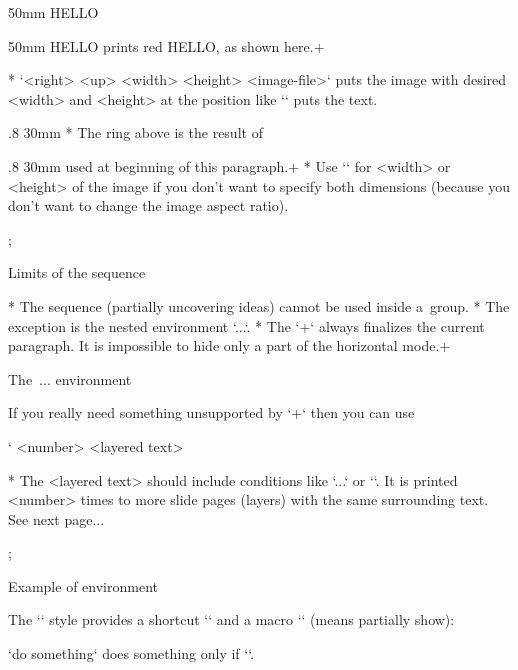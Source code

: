 \begtt
\puttext 0mm 50mm {\Red HELLO}
\endtt

  \puttext 0mm 50mm {\Red HELLO}
  prints red HELLO, as shown here.\pg+

* `\putpic <right> <up> <width> <height> {<image-file>}`
  puts the image with desired <width> and <height> at the position like
  `\puttext` puts the text.

  \putpic .8\hsize 20mm 30mm 
* The ring above is the result of

\begtt
\putpic .8\hsize 20mm 30mm 
\endtt
  used at beginning of this paragraph.\pg+
* Use `\nospec` for <width> or <height> of the image if you don't want to specify both
  dimensions (because you don't want to change the image aspect ratio).

\pg; %

\sec Limits of the \code{\\pg+} sequence

* The \code{\\pg+} sequence (partially uncovering ideas) cannot be used inside
  a~group.
* The exception is the nested environment `\begitems...\enditems`.
* The `\pg+` always finalizes the current paragraph.
  It is impossible to hide only a part of the horizontal mode.\pg+

\sec The \code{\\layers}\,...\code{\\endlayers} environment

If you really need something unsupported by `\pg+` then you can use

\begtt \catcode`
\layers <number>
<layered text>
\endlayers
\endtt

* The <layered text> should include conditions like
  `\ifnum\layernum...` or `\ifcase\layernum`.
  It is printed <number> times to more slide pages (layers) with the same
  surrounding text. See next page...

\pg; %

\sec Example of \code{\\layers} environment

The `\slides` style provides a shortcut `\use` and a macro `\pshow` (means
partially show):

\begtt
\def\use#1#2{\ifnum\layernum#1\relax#2\fi}
\def\pshow#1{\use{=#1}\Red \use{<#1}\Transparent \ignorespaces}
\endtt
`\use{=3}{do something}` does something only if ``.

